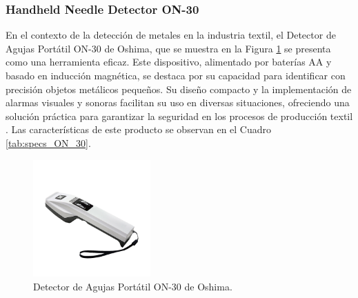 \subsubsection{Handheld Needle Detector ON-30}

En el contexto de la detección de metales en la industria textil, el Detector de Agujas Portátil ON-30 de Oshima, que se muestra en la Figura \ref{fig:oshima_on_30} se presenta como una herramienta eficaz. Este dispositivo, alimentado por baterías AA y basado en inducción magnética, se destaca por su capacidad para identificar con precisión objetos metálicos pequeños. Su diseño compacto y la implementación de alarmas visuales y sonoras facilitan su uso en diversas situaciones, ofreciendo una solución práctica para garantizar la seguridad en los procesos de producción textil \cite{oshimaEfficientHandheld}. Las características de este producto se observan en el Cuadro \ref{tab:specs_ON_30}.

\begin{figure}[H]
	\centering
	\includegraphics[width=0.4\textwidth]{img/oshima_on_30.png}
	\caption{Detector de Agujas Portátil ON-30 de Oshima.}
	\label{fig:oshima_on_30}
\end{figure}

